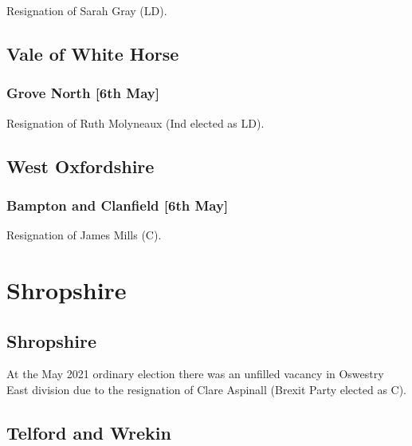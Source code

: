 \documentclass[a4paper,openany]{book}
\begin{document}
\begin{resultsiii}
Resignation of Sarah Gray (LD).

\subsection*{Vale of White Horse}

\subsubsection*{Grove North \hspace*{\fill}\nolinebreak[1]%
	\enspace\hspace*{\fill}
	[6th May]}


Resignation of Ruth Molyneaux (Ind elected as LD).

\subsection*{West Oxfordshire}

\subsubsection*{Bampton and Clanfield \hspace*{\fill}\nolinebreak[1]%
	\enspace\hspace*{\fill}
	[6th May]}


Resignation of James Mills (C).

\section{Shropshire}

\subsection*{Shropshire}

At the May 2021 ordinary election there was an unfilled vacancy in Oswestry East division due to the resignation of Clare Aspinall (Brexit Party elected as C).

\subsection*{Telford and Wrekin}


\end{resultsiii}
\end{document}

